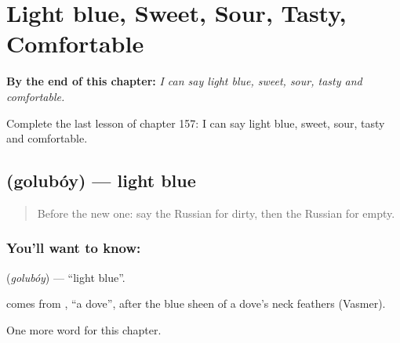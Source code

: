 
\chapter{Light blue, Sweet, Sour, Tasty, Comfortable}
\label{ch:ru-light-blue-sweet-sour-tasty-comfortable}

\begin{chapteropening}
\textbf{By the end of this chapter:} \emph{I can say light blue, sweet, sour, tasty and comfortable.}

Complete the last lesson of chapter 157: I can say light blue, sweet, sour, tasty and comfortable.
\end{chapteropening}

\section[\texorpdfstring{\ru{голубой} (golubóy)}{голубой (golubóy)}]{ (golubóy) — light blue}

\label{lesson:RU-C157-goluboy}



\begin{quote}
Before the new one: say the Russian for dirty, then the Russian for empty.
\end{quote}

\subsection*{You'll want to know: }
\textbf{} (\emph{golubóy}) — \textquotedblleft{}light blue\textquotedblright{}.

\begin{cousinweb}
\textbf{} comes from \emph{}, \textquotedblleft{}a dove\textquotedblright{}, after the blue sheen of a dove's neck feathers (Vasmer).
\end{cousinweb}

\begin{grammarlens}[title={What you've built}]
One more word for this chapter.
\end{grammarlens}

